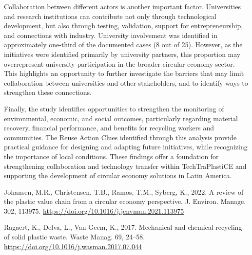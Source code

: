 \documentclass[
  12pt,
  oneside]{book}
\newlength{\cslhangindent}
\newenvironment{CSLReferences}[2] %
 {\begin{list}{}{%
  \setlength{\itemindent}{0pt}
  \setlength{\leftmargin}{0pt}
  \setlength{\parsep}{0pt}
  \ifodd #1
   \setlength{\leftmargin}{\cslhangindent}
   \setlength{\itemindent}{-1\cslhangindent}
  \fi
  \setlength{\itemsep}{#2\baselineskip}}}
 {\end{list}}
\begin{document}
Collaboration between different actors is another important factor.
Universities and research institutions can contribute not only through
technological development, but also through testing, validation, support
for entrepreneurship, and connections with industry. University
involvement was identified in approximately one-third of the documented
cases (8 out of 25). However, as the initiatives were identified
primarily by university partners, this proportion may overrepresent
university participation in the broader circular economy sector. This
highlights an opportunity to further investigate the barriers that may
limit collaboration between universities and other stakeholders, and to
identify ways to strengthen these connections.

Finally, the study identifies opportunities to strengthen the monitoring
of environmental, economic, and social outcomes, particularly regarding
material recovery, financial performance, and benefits for recycling
workers and communities. The Reuse Action Clues identified through this
analysis provide practical guidance for designing and adapting future
initiatives, while recognizing the importance of local conditions. These
findings offer a foundation for strengthening collaboration and
technology transfer within TechTraPlastiCE and supporting the
development of circular economy solutions in Latin America.

\protect{}\label{refs}
\begin{CSLReferences}{1}{0}
Johansen, M.R., Christensen, T.B., Ramos, T.M., Syberg, K., 2022. A
review of the plastic value chain from a circular economy perspective.
J. Environ. Manage. 302, 113975.
\url{https://doi.org/10.1016/j.jenvman.2021.113975}

Ragaert, K., Delva, L., Van Geem, K., 2017. Mechanical and chemical
recycling of solid plastic waste. Waste Manag. 69, 24--58.
\url{https://doi.org/10.1016/j.wasman.2017.07.044}

\end{CSLReferences}


\backmatter
\end{document}
